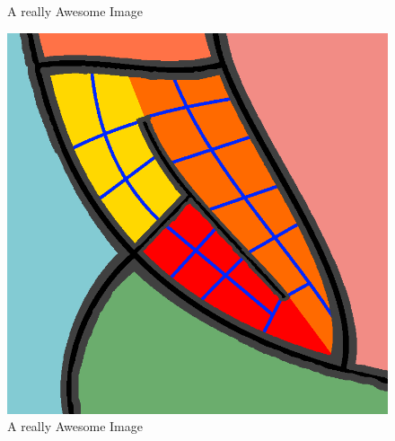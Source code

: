 \begin{figure}[!htb]
    \caption{A really Awesome Image}\label{fig:awesome_image2}
  \endminipage\hfill
    \includegraphics[width=\linewidth]{figure/method_generation_3.png}
    \caption{A really Awesome Image}\label{fig:awesome_image3}
  \endminipage
\end{figure}
  



